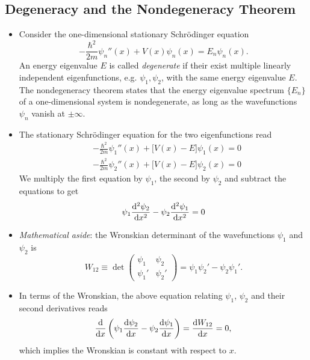 \documentclass[11pt, a4paper]{article}
\newcommand{\Schro}{Schr\"{o}dinger\xspace}
\newcommand{\p}{\psi}  %
\begin{document}
\subsection{Degeneracy and the Nondegeneracy Theorem}
\begin{itemize}
	\item Consider the one-dimensional stationary \Schro equation 
	\begin{equation*}
		-\frac{\hbar^{2}}{2m}\psi_{n}''(x) + V(x)\p_{n}(x) = E_{n}\p_{n}(x).
	\end{equation*}
	An energy eigenvalue $ E $ is called \textit{degenerate} if their exist multiple linearly independent eigenfunctions, e.g. $ \psi_{1}, \psi_{2} $, with the same energy eigenvalue $ E $. The nondegeneracy theorem states that the energy eigenvalue spectrum $ \{E_{n}\} $ of a one-dimensional system is nondegenerate, as long as the wavefunctions $ \psi_{n} $ vanish at $ \pm \infty $.
	
	\item The stationary \Schro equation for the two  eigenfunctions read
	\begin{align*}
		& -\frac{\hbar^{2}}{2m}\psi_{1}''(x) + \big[V(x) - E\big]\p_{1}(x) = 0\\
		& -\frac{\hbar^{2}}{2m}\psi_{2}''(x) + \big[V(x) - E\big]\p_{2}(x) = 0
	\end{align*}
	We multiply the first equation by $ \p_{1} $, the second by $ \p_{2} $ and subtract the equations to get
	\begin{equation*}
		\p_{1}\dv[2]{\p_{2}}{x} - \p_{2}\dv[2]{\p_{1}}{x} = 0
	\end{equation*}
	
	\item \textit{Mathematical aside}: the Wronskian determinant of the wavefunctions $ \p_{1} $ and $ \p_{2} $ is
	\begin{equation*}
		W_{12} \equiv \det 
		\begin{pmatrix}
			\p_{1} & \p_{2}\\
			\p_{1}' & \p_{2}'
		\end{pmatrix}
		= \p_{1}\p_{2}' - \p_{2}\p_{1}'.
	\end{equation*}
	
	\item In terms of the Wronskian, the above equation relating $ \p_{1} $, $ \p_{2} $ and their second derivatives reads
	\begin{equation*}
		\dv{x}\left(\p_{1}\dv{\p_{2}}{x} - \p_{2}\dv{\p_{1}}{x}\right) = \dv{W_{12}}{x} = 0,
	\end{equation*}
	which implies the Wronskian is constant with respect to $ x $. 
	

\end{itemize}
\end{document}
